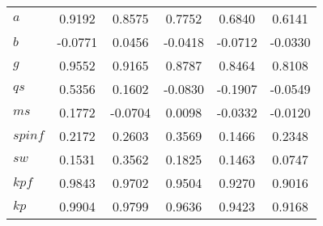 \begin{center}
\begin{longtable}{lccccc}
$a         $	 & 	     0.9192	 & 	     0.8575	 & 	     0.7752	 & 	     0.6840	 & 	     0.6141 \\ 
$b         $	 & 	    -0.0771	 & 	     0.0456	 & 	    -0.0418	 & 	    -0.0712	 & 	    -0.0330 \\ 
$g         $	 & 	     0.9552	 & 	     0.9165	 & 	     0.8787	 & 	     0.8464	 & 	     0.8108 \\ 
$qs        $	 & 	     0.5356	 & 	     0.1602	 & 	    -0.0830	 & 	    -0.1907	 & 	    -0.0549 \\ 
$ms        $	 & 	     0.1772	 & 	    -0.0704	 & 	     0.0098	 & 	    -0.0332	 & 	    -0.0120 \\ 
$spinf     $	 & 	     0.2172	 & 	     0.2603	 & 	     0.3569	 & 	     0.1466	 & 	     0.2348 \\ 
$sw        $	 & 	     0.1531	 & 	     0.3562	 & 	     0.1825	 & 	     0.1463	 & 	     0.0747 \\ 
$kpf       $	 & 	     0.9843	 & 	     0.9702	 & 	     0.9504	 & 	     0.9270	 & 	     0.9016 \\ 
$kp        $	 & 	     0.9904	 & 	     0.9799	 & 	     0.9636	 & 	     0.9423	 & 	     0.9168 \\ 
\end{longtable}
 \end{center}
